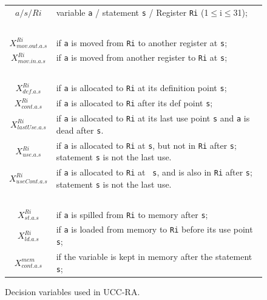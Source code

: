 \begin{figure}[htbp]
\begin{tabular}{c|p{5.0in}} 
$a / s / Ri$  & variable {\tt a} / statement {\tt s} / Register {\tt Ri} (1$\le$i$\le$31); \\
~\\

$X_{mov.out.a.s}^{Ri}$ & if {\tt a} is moved from {\tt Ri}
to another register at {\tt s}; \\

$X_{mov.in.a.s}^{Ri}$ & if {\tt a} is moved from another
register to {\tt Ri} at {\tt s}; \\

~ \\

$X_{def.a.s}^{Ri}$ & if {\tt a} is allocated to {\tt Ri} at its
definition point {\tt s};\\

$X_{cont.a.s}^{Ri}$ & if {\tt a} is allocated to {\tt Ri} after its
def point {\tt s}; \\

$X_{lastUse.a.s}^{Ri}$ & if {\tt a} is allocated to {\tt Ri} at its
last use point {\tt s} and {\tt a} is dead after {\tt s}. \\

$X_{use.a.s}^{Ri}$ & if {\tt a} is allocated to {\tt Ri} at {\tt s},
but not in {\tt Ri} after {\tt s}; statement {\tt s} is not the last
use.\\

$X_{useCont.a.s}^{Ri}$ & if {\tt a} is allocated to {\tt Ri} at {\tt
s}, and is also in {\tt Ri} after {\tt s}; statement {\tt s} is not
the last use.\\

~ \\

$X_{st.a.s}^{Ri}$ & if {\tt a} is spilled from {\tt Ri} to memory
after {\tt s};\\

$X_{ld.a.s}^{Ri}$ & if {\tt a} is loaded from memory to {\tt Ri}
before its use point {\tt s}; \\

$X_{cont.a.s}^{mem}$ & if the variable is kept in memory after the
statement {\tt s};
\end{tabular}
\caption{Decision variables used in UCC-RA.}
\end{figure}

